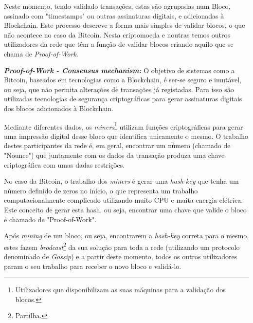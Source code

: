 \documentclass{llncs}
\begin{document}
	Neste momento, tendo validado transações, estas são agrupadas num Bloco, assinado com "timestamps" ou outras assinaturas digitais, e adicionadas à Blockchain. Este processo descreve a forma mais simples de validar blocos, o que não acontece no caso da Bitcoin. Nesta criptomoeda e noutras temos outros utilizadores da rede que têm a função de validar blocos criando aquilo que se chama de \textit{Proof-of-Work}.\par
	
	\vspace{0.05cm}

\textbf{\textit{Proof-of-Work - Consensus mechanism:}} O objetivo de sistemas como a Bitcoin, baseados em tecnologias como a Blockchain, é ser-se seguro e imutável, ou seja, que não permita alterações de transações já registadas. Para isso são utilizadas tecnologias de segurança criptográficas para gerar assinaturas digitais dos blocos adicionados à Blockchain. \par

    \vspace{0.05cm}

	Mediante diferentes dados, os \textit{miners}\footnote{Utilizadores que disponibilizam as suas máquinas para a validação dos blocos.} utilizam funções criptográficas para gerar uma impressão digital desse bloco que identifica unicamente o mesmo. O trabalho destes participantes da rede é, em geral, encontrar um número (chamado de "Nounce") que juntamente com os dados da transação produza uma chave criptográfica com umas dadas restrições. \par

	    \vspace{0.05cm}

No caso da Bitcoin, o trabalho dos \textit{miners} é gerar uma \textit{hash-key} que tenha um número definido de zeros no início, o que representa um trabalho computacionalmente complicado utilizando muito CPU e muita energia elétrica. Este conceito de gerar esta hash, ou seja, encontrar uma chave que valide o bloco é chamado de "Proof-of-Work".

	    \vspace{0.5cm}
	Após \textit{mining} de um bloco, ou seja, encontrarem a \textit{hash-key} correta para o mesmo, estes fazem \textit{brodcast}\footnote{Partilha.} da sua solução para toda a rede (utilizando um protocolo denominado de \textit{Gossip}) e a partir deste momento, todos os outros utilizadores param o seu trabalho para receber o novo bloco e validá-lo.
\end{document}
